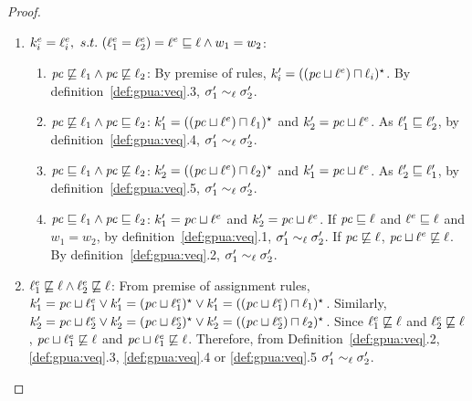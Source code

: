 \begin{proof}
\begin{enumerate}
\begin{enumerate}
          \item $k^{e}_i = \ell^{e}_i,~s.t.~ (\ell^e_1 = \ell^e_2) = \ell^e \sqsubseteq \ell \wedge
          w_1 = w_2$:
          \begin{enumerate}
            \item $\mathit{pc} \not\sqsubseteq \ell_1 \wedge \mathit{pc}
              \not\sqsubseteq \ell_2$: By premise of  rules, $k_i'
              =   ((\mathit{pc} \sqcup \ell^e) \sqcap \ell_i) {}^\star $. By
              definition~\ref{def:gpua:veq}.3, $\sigma_1' \sim_\ell
              \sigma_2'$.
            \item $\mathit{pc} \not\sqsubseteq \ell_1 \wedge \mathit{pc}
              \sqsubseteq \ell_2$: $k_1' =   ((\mathit{pc} \sqcup \ell^e) \sqcap \ell_1) {}^\star
               $ and $k_2' = \mathit{pc} \sqcup \ell^e$. As $\ell_1'
              \sqsubseteq \ell_2'$, by
              definition~\ref{def:gpua:veq}.4, $\sigma_1' \sim_\ell
              \sigma_2'$.
            \item $\mathit{pc} \sqsubseteq \ell_1 \wedge \mathit{pc}
              \not \sqsubseteq \ell_2$: $k_2' =   ((\mathit{pc} \sqcup \ell^e) \sqcap \ell_2) {}^\star
               $ and $k_1' = \mathit{pc} \sqcup \ell^e$. As $\ell_2'
              \sqsubseteq \ell_1'$, by
              definition~\ref{def:gpua:veq}.5, $\sigma_1' \sim_\ell
              \sigma_2'$.
            \item $\mathit{pc} \sqsubseteq \ell_1 \wedge \mathit{pc}
              \sqsubseteq \ell_2$: $k_1' = \mathit{pc} \sqcup \ell^e$ and
              $k_2' = \mathit{pc} \sqcup \ell^e$. If $\mathit{pc} \sqsubseteq \ell$
              and $\ell^e \sqsubseteq \ell$ and $w_1 = w_2$, by 
              definition~\ref{def:gpua:veq}.1, $\sigma_1' \sim_\ell
              \sigma_2'$. If $\mathit{pc} \not\sqsubseteq \ell$, $\mathit{pc} \sqcup
              \ell^e \not\sqsubseteq \ell$. By
              definition~\ref{def:gpua:veq}.2, $\sigma_1' \sim_\ell
              \sigma_2'$.
          \end{enumerate}
       
        \item $\ell^e_1 \not\sqsubseteq \ell \wedge
          \ell^e_2 \not\sqsubseteq \ell$: 
          From premise of assignment rules, 
          $k_1'= \mathit{pc} \sqcup \ell^e_1 \vee
          k_1'=   (\mathit{pc} \sqcup \ell^e_1) {}^\star
            \vee  k_1' =   ((\mathit{pc} \sqcup \ell^e_1) \sqcap
          \ell_1) {}^\star  $.
          Similarly, 
          $k_2' = \mathit{pc} \sqcup \ell^{e}_2 \vee
          k_2'=   (\mathit{pc} \sqcup \ell^{e}_2) {}^\star
            \vee  k_2'=   ((\mathit{pc} \sqcup \ell^e_2) \sqcap
          \ell_2) {}^\star  $.
          Since $\ell^{e}_1  \not\sqsubseteq \ell$ and $\ell^{e}_2
          \not\sqsubseteq \ell$, $\mathit{pc} \sqcup \ell^{e}_1  \not\sqsubseteq \ell$
          and $\mathit{pc} \sqcup \ell^{e}_1  \not\sqsubseteq \ell$. Therefore, from
          Definition~\ref{def:gpua:veq}.2, \ref{def:gpua:veq}.3, \ref{def:gpua:veq}.4 or
          \ref{def:gpua:veq}.5 $\sigma_1' \sim_\ell \sigma_2'$.        
 

\end{enumerate}
\end{enumerate}
\end{proof}
